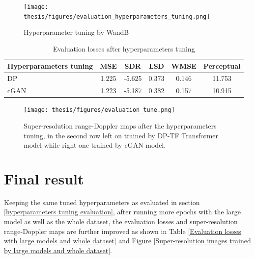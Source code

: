 \begin{figure}[!htp]
    \centering
    \texttt{[image: thesis/figures/evaluation\_hyperparameters\_tuning.png]}
    \caption{Hyperparameter tuning by WandB}
    \label{Hyperparameters tuning by WandB}
\end{figure}

\begin{table}[!htp]
    \centering
    \caption{Evaluation losses after hyperparameters tuning}
    \label{Evaluation losses after hyperparameters tuning}
    \begin{tabular}{l|c|c|c|c|c}
        \hline
        Hyperparameters tuning & MSE & SDR & LSD & WMSE & Perceptual \\
        \hline
        DP & 1.225 & -5.625 & 0.373 & 0.146 & 11.753 \\
        \hline
        cGAN & 1.223 & -5.187 & 0.382 & 0.157 & 10.915 \\
        \hline
    \end{tabular}
\end{table}

\begin{figure}[!htp]
    \centering
    \texttt{[image: thesis/figures/evaluation\_tune.png]}
    \caption{Super-resolution range-Doppler maps after the hyperparameters tuning, in the second row left on trained by DP-TF Transformer model while right one trained by cGAN model.}
    \label{Super-resolution images after the hyperparameters tuning}
\end{figure}


\section{Final result} \label{final result evaluation}
Keeping the same tuned hyperparameters as evaluated in section \ref{hyperparameters tuning evaluation}, after running more epochs with the large model as well as the whole dataset, the evaluation losses and super-resolution range-Doppler maps are further improved as shown in Table \ref{Evaluation losses with large models and whole dataset} and Figure \ref{Super-resolution images trained by large models and whole dataset}.

